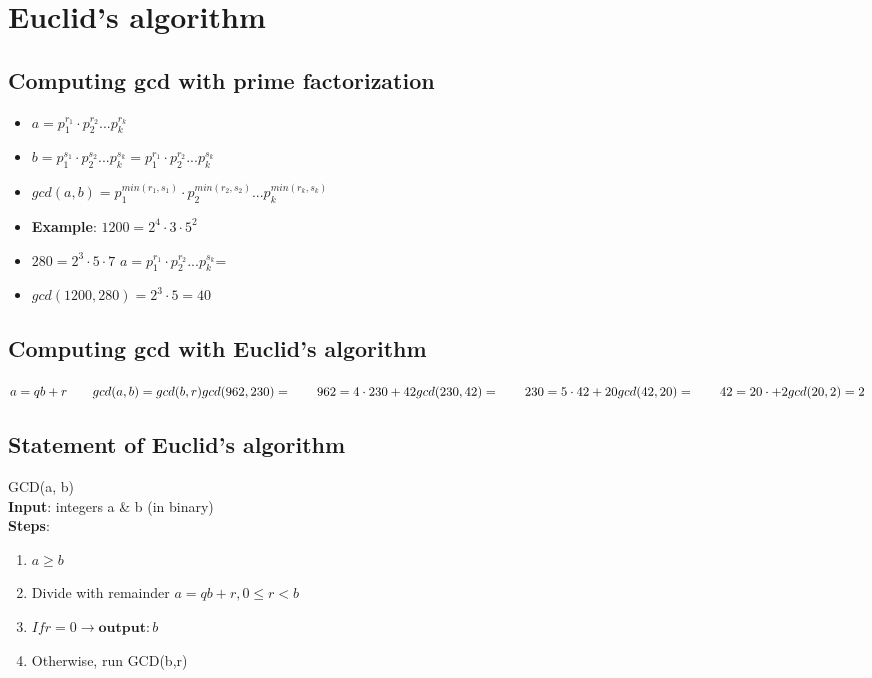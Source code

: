 \documentclass[9pt, letterpaper, oneside]{article}
\begin{document}
\section{Euclid's algorithm}

\subsection{Computing gcd with prime factorization}
    \begin{itemize}
        \item $a = p_1^{r_1} \cdot p_2^{r_2} ... p_k^{r_k}$
        \item $b = p_1^{s_1} \cdot p_2^{s_2} ... p_k^{s_k} = p_1^{r_1} \cdot p_2^{r_2} ... p_k^{s_k}$ 
        \item $gcd(a, b) = p_1^{min(r_1, s_1)} \cdot p_2^{min(r_2, s_2)} ... p_k^{min(r_k, s_k)}$

        \item \textbf{Example}: $1200 = 2^4 \cdot 3 \cdot 5^2$
        \item $280= 2^3 \cdot 5 \cdot 7$ $a = p_1^{r_1} \cdot p_2^{r_2} ... p_k^{s_k}$=
        \item $gcd(1200, 280) = 2^3 \cdot 5 = 40$
    \end{itemize}

\subsection{Computing gcd with Euclid's algorithm}
$a = qb + r \qquad gcd(a,b) = gcd(b, r)\\
gcd(962, 230) = \qquad 962 = 4 \cdot 230 + 42\\
gcd(230, 42) = \qquad 230 = 5 \cdot 42 + 20\\
gcd(42, 20) = \qquad 42 = 20 \cdot + 2\\
gcd(20, 2) =\\
2
$

\subsection{Statement of Euclid's algorithm}
GCD(a, b) \\
\textbf{Input}: integers a \& b (in binary)\\
\textbf{Steps}:\\
\begin{enumerate}
    \item $a \geq b$
    \item Divide with remainder $a = qb + r, 0 \leq r < b$
    \item $If r = 0 \to \textbf{output}: b$
    \item Otherwise, run GCD(b,r)
\end{enumerate}
\end{document}
